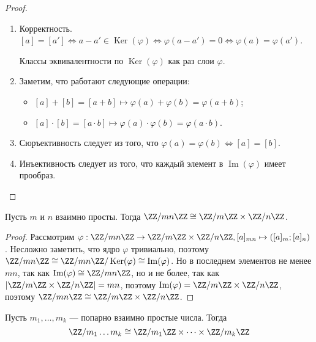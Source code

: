 \documentclass[12pt,a4paper]{article}
\DeclareMathOperator{\Img}{Im}
\DeclareMathOperator{\Ker}{Ker}
\begin{document}
    \begin{proof}\ 
        \begin{enumerate}
            \item Корректность. $[a] = [a'] \Leftrightarrow a - a' \in \Ker(\varphi) \Leftrightarrow \varphi(a - a') = 0 \Leftrightarrow \varphi(a) = \varphi(a')$.
                \begin{remark}
                    Классы эквивалентности по $\Ker(\varphi)$ как раз слои $\varphi$.
                \end{remark}
            \item Заметим, что работают следующие операции:
                \begin{itemize}
                    \item $[a] + [b] = [a + b] \mapsto \varphi(a) + \varphi(b) = \varphi(a + b)$;
                    \item $[a] \cdot [b] = [a \cdot b] \mapsto \varphi(a) \cdot \varphi(b) = \varphi(a \cdot b)$. 
                \end{itemize}
            \item Сюръективность следует из того, что $\varphi(a) = \varphi(b) \Leftrightarrow [a] = [b]$.
            \item Инъективность следует из того, что каждый элемент в $\Img(\varphi)$ имеет прообраз.
        \end{enumerate}
    \end{proof}

    \begin{theorem}
        Пусть $m$ и $n$ взаимно просты. Тогда $\ZZ/mn\ZZ \cong \ZZ/m\ZZ \times \ZZ/n\ZZ$.
    \end{theorem}

    \begin{proof}
        Рассмотрим $\varphi: \ZZ/mn\ZZ \to \ZZ/m\ZZ \times \ZZ/n\ZZ, [a]_{mn} \mapsto ([a]_m; [a]_n)$. Несложно заметить, что ядро $\varphi$ тривиально, поэтому $\ZZ/mn\ZZ \cong \ZZ/mn\ZZ/\Ker(\varphi) \cong \Img(\varphi)$. Но в последнем элементов не менее $mn$, так как $\Img(\varphi) \cong \ZZ/mn\ZZ$, но и не более, так как $|\ZZ/m\ZZ \times \ZZ/n\ZZ| = mn$, поэтому $\Img(\varphi) = \ZZ/m\ZZ \times \ZZ/n\ZZ$, поэтому $\ZZ/mn\ZZ \cong \ZZ/m\ZZ \times \ZZ/n\ZZ$.
    \end{proof}

    \begin{theorem}[КТО]
        Пусть $m_1, \dots, m_k$ --- попарно взаимно простые числа. Тогда
        \[\ZZ/m_1\dots m_k \cong \ZZ/m_1\ZZ \times \dots \times \ZZ/m_k\ZZ\]
    \end{theorem}
\end{document}
